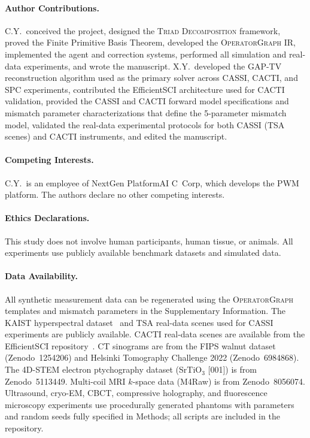 \documentclass[11pt]{article}
\newcommand{\triad}{\textsc{Triad Decomposition}}
\newcommand{\opg}{\textsc{OperatorGraph}}
\begin{document}
\paragraph{Author Contributions.}
C.Y.\ conceived the project, designed the \triad{} framework, proved the Finite Primitive Basis Theorem, developed the \opg{} IR, implemented the agent and correction systems, performed all simulation and real-data experiments, and wrote the manuscript. X.Y.\ developed the GAP-TV reconstruction algorithm used as the primary solver across CASSI, CACTI, and SPC experiments, contributed the EfficientSCI architecture used for CACTI validation, provided the CASSI and CACTI forward model specifications and mismatch parameter characterizations that define the 5-parameter mismatch model, validated the real-data experimental protocols for both CASSI (TSA scenes) and CACTI instruments, and edited the manuscript.

\paragraph{Competing Interests.}
C.Y.\ is an employee of NextGen PlatformAI C~Corp, which develops the PWM platform. The authors declare no other competing interests.

\paragraph{Ethics Declarations.}
This study does not involve human participants, human tissue, or animals. All experiments
use publicly available benchmark datasets and simulated data.

\paragraph{Data Availability.}
All synthetic measurement data can be regenerated using the \opg{} templates and mismatch parameters in the Supplementary Information. The KAIST hyperspectral dataset~\cite{choi2017kaist} and TSA real-data scenes used for CASSI experiments are publicly available. CACTI real-data scenes are available from the EfficientSCI repository~\cite{wang2023efficientsci}. CT sinograms are from the FIPS walnut dataset (Zenodo~1254206) and Helsinki Tomography Challenge 2022 (Zenodo~6984868). The 4D-STEM electron ptychography dataset (SrTiO$_3$ [001]) is from Zenodo~5113449. Multi-coil MRI $k$-space data (M4Raw) is from Zenodo~8056074. Ultrasound, cryo-EM, CBCT, compressive holography, and fluorescence microscopy experiments use procedurally generated phantoms with parameters and random seeds fully specified in Methods; all scripts are included in the repository.
\end{document}
